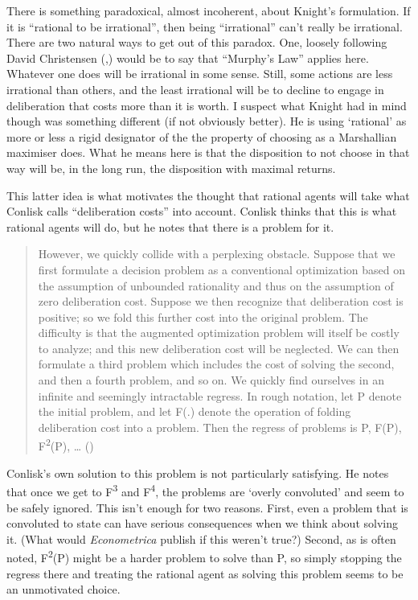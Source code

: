 \documentclass[
  12pt,
  letterpaper,
]{scrbook}
\begin{document}
There is something paradoxical, almost incoherent, about Knight's
formulation. If it is ``rational to be irrational'', then being
``irrational'' can't really be irrational. There are two natural ways to
get out of this paradox. One, loosely following David Christensen
(,) would be to say that ``Murphy's
Law'' applies here. Whatever one does will be irrational in some sense.
Still, some actions are less irrational than others, and the least
irrational will be to decline to engage in deliberation that costs more
than it is worth. I suspect what Knight had in mind though was something
different (if not obviously better). He is using `rational' as more or
less a rigid designator of the the property of choosing as a Marshallian
maximiser does. What he means here is that the disposition to not choose
in that way will be, in the long run, the disposition with maximal
returns.

This latter idea is what motivates the thought that rational agents will
take what Conlisk calls ``deliberation costs'' into account. Conlisk
thinks that this is what rational agents will do, but he notes that
there is a problem for it.

\begin{quote}
However, we quickly collide with a perplexing obstacle. Suppose that we
first formulate a decision problem as a conventional optimization based
on the assumption of unbounded rationality and thus on the assumption of
zero deliberation cost. Suppose we then recognize that deliberation cost
is positive; so we fold this further cost into the original problem. The
difficulty is that the augmented optimization problem will itself be
costly to analyze; and this new deliberation cost will be neglected. We
can then formulate a third problem which includes the cost of solving
the second, and then a fourth problem, and so on. We quickly find
ourselves in an infinite and seemingly intractable regress. In rough
notation, let P denote the initial problem, and let F(.) denote the
operation of folding deliberation cost into a problem. Then the regress
of problems is P, F(P), F\textsuperscript{2}(P), \ldots{}
()
\end{quote}

Conlisk's own solution to this problem is not particularly satisfying.
He notes that once we get to F\textsuperscript{3} and
F\textsuperscript{4}, the problems are `overly convoluted' and seem to
be safely ignored. This isn't enough for two reasons. First, even a
problem that is convoluted to state can have serious consequences when
we think about solving it. (What would \emph{Econometrica} publish if
this weren't true?) Second, as is often noted, F\textsuperscript{2}(P)
might be a harder problem to solve than P, so simply stopping the
regress there and treating the rational agent as solving this problem
seems to be an unmotivated choice.
\end{document}
